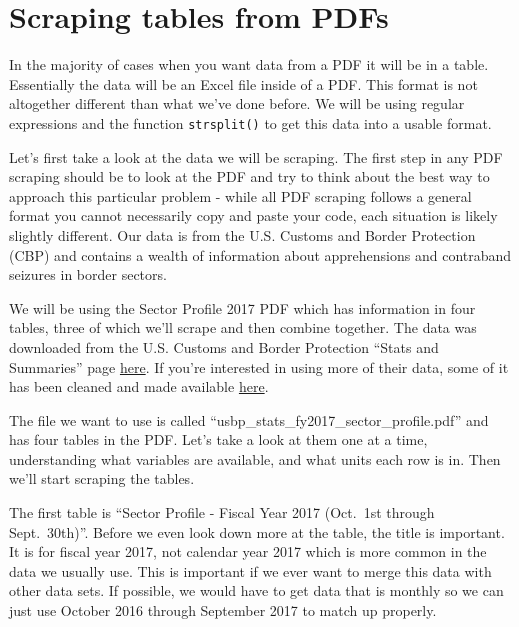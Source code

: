 \documentclass[
  12pt,
]{book}
\begin{document}
\hypertarget{scrape-table}{%
\chapter{Scraping tables from PDFs}\label{scrape-table}}

In the majority of cases when you want data from a PDF it will be in a table. Essentially the data will be an Excel file inside of a PDF. This format is not altogether different than what we've done before. We will be using regular expressions and the function \texttt{strsplit()} to get this data into a usable format.

Let's first take a look at the data we will be scraping. The first step in any PDF scraping should be to look at the PDF and try to think about the best way to approach this particular problem - while all PDF scraping follows a general format you cannot necessarily copy and paste your code, each situation is likely slightly different. Our data is from the U.S. Customs and Border Protection (CBP) and contains a wealth of information about apprehensions and contraband seizures in border sectors.

We will be using the Sector Profile 2017 PDF which has information in four tables, three of which we'll scrape and then combine together. The data was downloaded from the U.S. Customs and Border Protection ``Stats and Summaries'' page \href{https://www.cbp.gov/newsroom/media-resources/stats}{here}. If you're interested in using more of their data, some of it has been cleaned and made available \href{https://www.openicpsr.org/openicpsr/project/109522/version/V2/view}{here}.

The file we want to use is called ``usbp\_stats\_fy2017\_sector\_profile.pdf'' and has four tables in the PDF. Let's take a look at them one at a time, understanding what variables are available, and what units each row is in. Then we'll start scraping the tables.

The first table is ``Sector Profile - Fiscal Year 2017 (Oct.~1st through Sept.~30th)''. Before we even look down more at the table, the title is important. It is for fiscal year 2017, not calendar year 2017 which is more common in the data we usually use. This is important if we ever want to merge this data with other data sets. If possible, we would have to get data that is monthly so we can just use October 2016 through September 2017 to match up properly.
\end{document}
